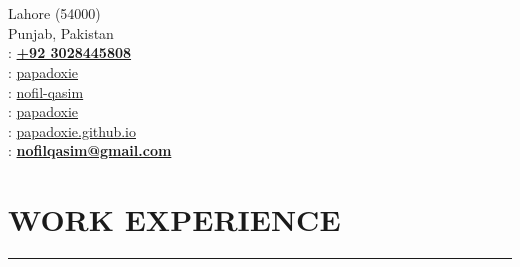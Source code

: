 \documentclass[]{resume}
\begin{document}
%
%

\hfill
\begin{minipage}[t]{0.66\textwidth}

    \vspace{-628pt}

    \hspace*{0pt}\hfill    \\
    \hspace*{0pt}\hfill    \\
    \hspace*{0pt}\hfill Lahore (54000) \\
    \hspace*{0pt}\hfill Punjab, Pakistan \\
    \hspace*{0pt}\hfill {}: \textbf{\href{tel:+923028445808}{+92 3028445808}} \\
    \hspace*{0pt}\hfill {}: \href{https://github.com/papadoxie}{papadoxie}\\
    \hspace*{0pt}\hfill {}: \href{https://linkedin.com/in/nofil-qasim}{nofil-qasim}\\
    \hspace*{0pt}\hfill {}: \href{https://tryhackme.com/p/papadoxie}{papadoxie}\\  
    \hspace*{0pt}\hfill {}: \href{https://papadoxie.github.io}{papadoxie.github.io}\\
    \hspace*{0pt}\hfill {}: \textbf{\href{mailto:nofilqasim@gmail.com}{nofilqasim@gmail.com}}



    \vspace{-7.15pt}
    
    \section{WORK EXPERIENCE}
    \noindent\rule{12.80cm}{0.4pt}


\end{minipage}
\end{document}
